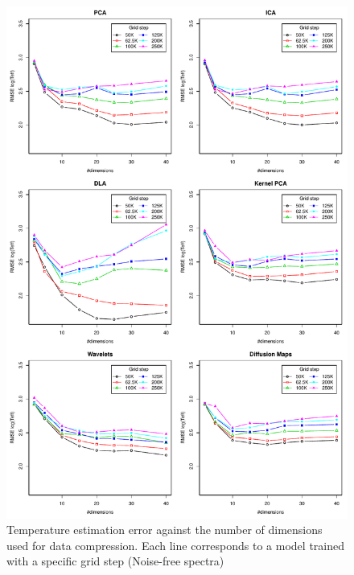 \documentclass[a4paper,fleqn,usenatbib]{mnras}
\begin{document}
{{{\begin{figure}
\centering\includegraphics[height=0.95\textheight]{bestSVM_Teff_N-RMSE_HR10_pure_all.pdf}
\caption{Temperature estimation error against the number of dimensions
  used for data compression. Each line corresponds to a model trained
  with a specific grid step (Noise-free spectra)}
\label{fig:gridpure}
\end{figure}

}}}
\end{document}
